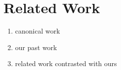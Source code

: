 \section{Related Work}
\begin{enumerate}
\item canonical work
\item our past work
\item related work contrasted with ours
\end{enumerate}
